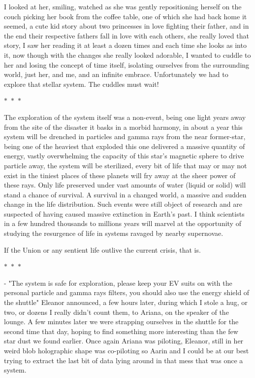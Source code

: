 \documentclass[colorlinks,12pt,a4paper]{book}
\newcommand\sep{\begin{center}
  \boldmath $\ast$~$\ast$~$\ast$
\end{center}}
\begin{document}
 I looked at her, smiling, watched as she was gently repositioning herself on the couch picking her book from the 
 coffee table, one of which she had back home it seemed, a cute kid story about two princesses in love fighting their father, 
 and in the end their respective fathers fall in love with each others, she really loved that story, 
 I saw her reading it at least a dozen times and each time she looks as into it, now though with the changes she really looked 
 adorable, I wanted to cuddle to her and losing the concept of time itself, isolating ourselves from the surrounding world, 
 just her, and me, and an infinite embrace. Unfortunately we had to explore that stellar system. The cuddles must wait!
 
 \sep
 
 The exploration of the system itself was a non-event, being one light years away from the site of the disaster it basks 
 in a morbid harmony, in about a year this system will be drenched in particles and gamma rays from the near former-star, 
 being one of the heaviest that exploded this one delivered a massive quantity of energy, vastly overwhelming the capacity 
 of this star's magnetic sphere to drive particle away, the system will be sterilized, every bit of life that may or may not exist
 in the tiniest places of these planets will fry away at the sheer power of these rays. Only life preserved under vast amounts of 
 water (liquid or solid) will stand a chance of survival. A survival in a changed world, a massive and sudden change in the life 
 distribution. Such events were still object of research and are suspected of having caused massive extinction in Earth's past.
 I think scientists in a few hundred thousands to millions years will marvel at the opportunity of studying the resurgence 
 of life in systems ravaged by nearby supernovae.\par 
 \bigskip
 
 If the Union or any sentient life outlive the current crisis, that is.
 
 \sep 
 
 - "The system is safe for exploration, please keep your EV suits on with the personal particle and gamma rays filters,
 you should also use the energy shield of the shuttle" Eleanor announced, a few hours later, during which I stole a hug, or two,
 or dozens I really didn't count them, to Ariana, on the speaker of the lounge. A few minutes later we were strapping ourselves in 
 the shuttle for the second time that day, hoping to find something more interesting than the few star dust we found earlier.
 Once again Ariana was piloting, Eleanor, still in her weird blob holographic shape was co-piloting so Aarin and I could be at our 
 best trying to extract the last bit of data lying around in that mess that was once a system.
 
\end{document}
